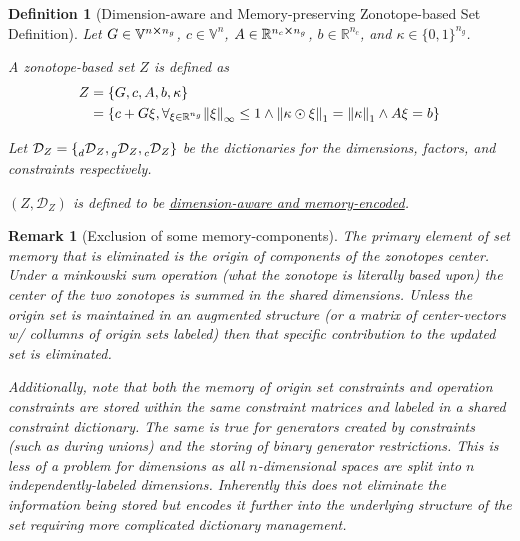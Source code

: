 \documentclass[11pt]{article}
\newtheorem{definition}{Definition}
\newtheorem{remark}{Remark}
\newcommand{\R}{\mathbb{R}} %
\newcommand{\V}{\mathbb{V}} %
\newcommand{\Dict}{\mathcal{D}} %
\newcommand{\dimDict}{\prescript{}{d}{\Dict}} %
\newcommand{\factorDict}{\prescript{}{g}{\Dict}} %
\newcommand{\conDict}{\prescript{}{c}{\Dict}} %
\newcommand{\dSet}{\kappa} %
\begin{document}
\begin{definition}[Dimension-aware and Memory-preserving Zonotope-based Set Definition]\label{def:dim-aware_mem-presev_setDef}
	Let $G \in \V^{n \cross n_g}$, $c \in \V^{n}$, $A \in \R^{n_c \cross n_g}$, $b \in \R^{n_c}$, and $\dSet \in \{0,1\}^{n_g}$.

	A zonotope-based set $Z$ is defined as
	\begin{equation}
		\begin{aligned}
			Z &= \{G,c,A,b,\dSet\} \\
			&= \qty{c + G \xi,  \forall_{\xi \in \R^{n_g}} \norm{\xi}_\infty \leq 1 \land \norm{\dSet \odot \xi}_{1} = \norm{\dSet}_{1} \land A\xi = b}
		\end{aligned}
	\end{equation}

	Let $\Dict_{Z} = \{\dimDict_{Z},\factorDict_{Z},\conDict_{Z}\}$ be the dictionaries for the dimensions, factors, and constraints respectively.
	
	$(Z,\Dict_{Z})$ is defined to be \emph{\underline{dimension-aware and memory-encoded}}.
	
	\todo{should we do $(Z,\Dict_{Z})$ or $Z = \{G,c,A,b,\dSet,\Dict_{Z}\}$?}
\end{definition}

\begin{remark}[Exclusion of some memory-components]
	The primary element of set memory that is eliminated is the origin of components of the zonotopes center.
	Under a minkowski sum operation (what the zonotope is literally based upon) the center of the two zonotopes is summed in the shared dimensions.
	Unless the origin set is maintained in an augmented structure (or a matrix of center-vectors w/ collumns of origin sets labeled) then that specific contribution to the updated set is eliminated.

	Additionally, note that both the memory of origin set constraints and operation constraints are stored within the same constraint matrices and labeled in a shared constraint dictionary.
	The same is true for generators created by constraints (such as during unions) and the storing of binary generator restrictions.
	This is less of a problem for dimensions as all $n$-dimensional spaces are split into $n$ independently-labeled dimensions.
	Inherently this does not eliminate the information being stored but encodes it further into the underlying structure of the set requiring more complicated dictionary management.
\end{remark}
\end{document}
